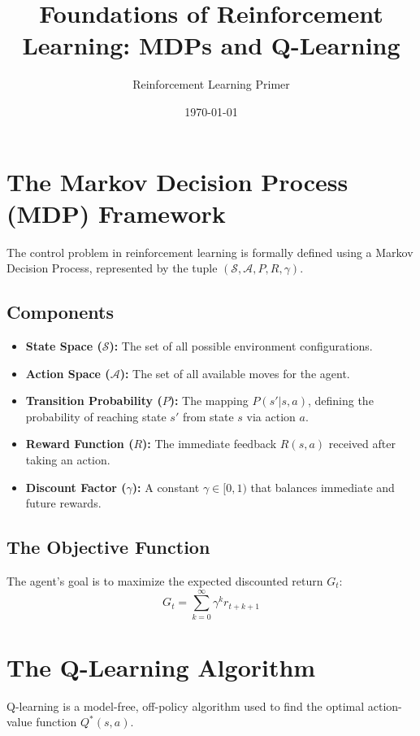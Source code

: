 \documentclass{article}
\title{Foundations of Reinforcement Learning: MDPs and Q-Learning}
\author{Reinforcement Learning Primer}
\date{\today}
\begin{document}
\maketitle

\section{The Markov Decision Process (MDP) Framework}
The control problem in reinforcement learning is formally defined using a Markov Decision Process, represented by the tuple $(\mathcal{S}, \mathcal{A}, P, R, \gamma)$.

\subsection{Components}
\begin{itemize}
    \item \textbf{State Space ($\mathcal{S}$):} The set of all possible environment configurations.
    \item \textbf{Action Space ($\mathcal{A}$):} The set of all available moves for the agent.
    \item \textbf{Transition Probability ($P$):} The mapping $P(s' | s, a)$, defining the probability of reaching state $s'$ from state $s$ via action $a$.
    \item \textbf{Reward Function ($R$):} The immediate feedback $R(s, a)$ received after taking an action.
    \item \textbf{Discount Factor ($\gamma$):} A constant $\gamma \in [0, 1)$ that balances immediate and future rewards.
\end{itemize}

\subsection{The Objective Function}
The agent's goal is to maximize the expected discounted return $G_t$:
\begin{equation}
    G_t = \sum_{k=0}^{\infty} \gamma^k r_{t+k+1}
\end{equation}

\section{The Q-Learning Algorithm}
Q-learning is a model-free, off-policy algorithm used to find the optimal action-value function $Q^*(s, a)$.
\end{document}
